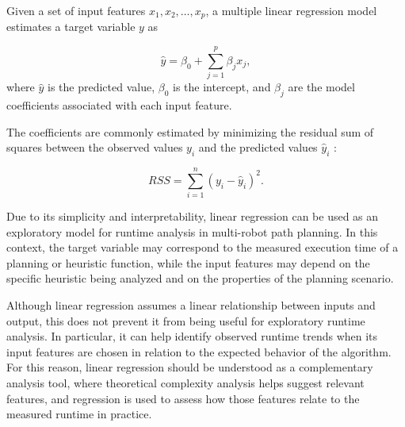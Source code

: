 Given a set of input features \(x_1, x_2, \ldots, x_p\), a multiple linear regression model estimates
a target variable \(y\) as

\begin{equation}
    \hat{y}
    =
    \beta_0
    +
    \sum_{j=1}^{p}
    \beta_j x_j,
\end{equation}
where \(\hat{y}\) is the predicted value, \(\beta_0\) is the intercept, and \(\beta_j\) are the model
coefficients associated with each input feature.

The coefficients are commonly estimated by minimizing the residual sum of squares between
the observed values \(y_i\) and the predicted values \(\hat{y}_i\) \cite{montgomery2021linear}:

\begin{equation}
    RSS
    =
    \sum_{i=1}^{n}
    (y_i - \hat{y}_i)^2.
\end{equation}

Due to its simplicity and interpretability, linear regression can be used as an exploratory model for runtime analysis in multi-robot path planning. In this context, the target variable may correspond to the measured execution time of a planning or heuristic function, while the input features may depend on the specific heuristic being analyzed and on the properties of the planning scenario.

Although linear regression assumes a linear relationship between inputs and output, this does not prevent it from being useful for exploratory runtime analysis. In particular, it can help identify observed runtime trends when its input features are chosen in relation to the expected behavior of the algorithm. For this reason, linear regression should be understood as a complementary analysis tool, where theoretical complexity analysis helps suggest relevant features, and regression is used to assess how those features relate to the measured runtime in practice.

